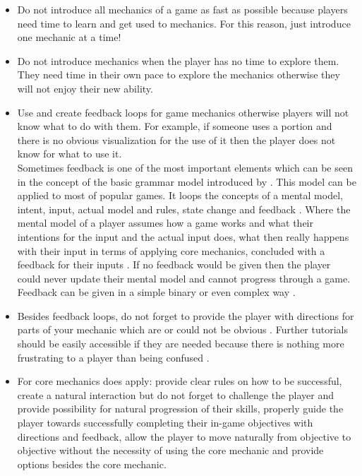 \documentclass[MGS,Master,english]{twbook}%
\begin{document}
\begin{itemize}
	\item Do not introduce all mechanics of a game as fast as possible because players need time to learn and get used to mechanics. For this reason, just introduce one mechanic at a time! \cite{mechanic::gamasutra::MaxPears}
	\item Do not introduce mechanics when the player has no time to explore them. They need time in their own pace to explore the mechanics otherwise they will not enjoy their new ability. \cite{mechanic::gamasutra::MaxPears}
	\item Use and create feedback loops for game mechanics otherwise players will not know what to do with them. For example, if someone uses a portion and there is no obvious visualization for the use of it then the player does not know for what to use it. \cite{gameDesign::gameMechanicsAdvancedGameDesign}\\
	Sometimes feedback is one of the most important elements which can be seen in the concept of the basic grammar model introduced by \cite{mechanic::BasicGrammarModel}. This model can be applied to most of popular games. It loops the concepts of a mental model, intent, input, actual model and rules, state change and feedback \cite{mechanic::BasicGrammarModel}. Where the mental model of a player assumes how a game works and what their intentions for the input and the actual input does, what then really happens with their input in terms of applying core mechanics, concluded with a feedback for their inputs \cite{mechanic::BasicGrammarModel}. If no feedback would be given then the player could never update their mental model and cannot progress through a game. Feedback can be given in a simple binary or even complex way \cite{mechanic::BasicGrammarModel}.
	\item Besides feedback loops, do not forget to provide the player with directions for parts of your mechanic which are or could not be obvious \cite{mechanic::gamasutra::MaxPears}. Further tutorials should be easily accessible if they are needed because there is nothing more frustrating to a player than being confused \cite{mechanic::gamasutra::DanielDoan}.
	\item For core mechanics does apply: provide clear rules on how to be successful, create a natural interaction but do not forget to challenge the player and provide possibility for natural progression of their skills, properly guide the player towards successfully completing their in-game objectives with directions and feedback, allow the player to move naturally from objective to objective without the necessity of using the core mechanic and provide options besides the core mechanic. \cite{mechanic::gamasutra::DanielDoan}

\end{itemize}
\end{document}
